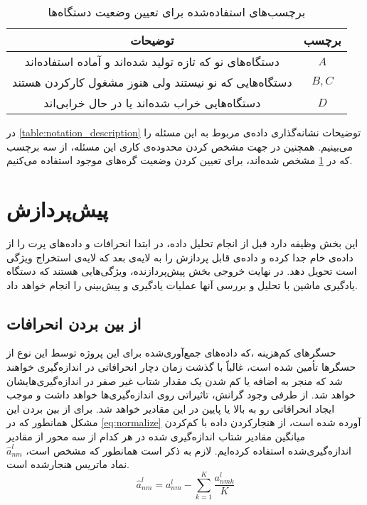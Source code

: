 \begin{table}[h!]
  \begin{center}
    \caption{برچسب‌های استفاده‌شده برای تعیین وضعیت دستگاه‌ها}
    \label{table:node_state_labels}
    \begin{tabular}{|c|c|} %
    	\hline
توضیحات & برچسب\\
    	\hline \hline
دستگاه‌های نو که تازه تولید شده‌اند و آماده استفاده‌اند & $A$\\
    	\hline
دستگاه‌هایی که نو نیستند ولی هنوز مشغول کارکردن هستند & $B, C$\\
    	\hline
  دستگاه‌هایی خراب‌ شده‌اند یا در حال خرابی‌اند & $D$\\
    	\hline
    \end{tabular}
  \end{center}
\end{table}

در \cref{table:notation_description} توضیحات نشانه‌گذاری داده‌ی مربوط به این مسئله را می‌بینیم. همچنین در جهت مشخص کردن محدوده‌ی کاری این مسئله، از سه برچسب که در \cref{table:node_state_labels} مشخص شده‌اند، برای تعیین کردن وضعیت گره‌های موجود استفاده می‌کنیم.

\section{پیش‌پردازش}
این بخش وظیفه دارد قبل از انجام تحلیل داده، در ابتدا انحرافات و داده‌های پرت را از داده‌ی خام جدا کرده و داده‌ی قابل پردازش را به لایه‌ی بعد که لایه‌ی استخراج ویژگی‌ است تحویل دهد. در نهایت خروجی بخش پیش‌پردازنده، ویژگی‌هایی هستند که دستگاه یادگیری ماشین با تحلیل و بررسی آنها عملیات یادگیری و پیش‌بینی را انجام خواهد داد.

\subsection{از بین بردن انحرافات}
 حسگرهای کم‌هزینه  ،که داده‌های جمع‌آوری‌شده برای این پروژه توسط این نوع از حسگرها تأمین شده است، غالباً با گذشت زمان دچار انحرافاتی در اندازه‌گیری خواهند شد که منجر به اضافه یا کم شدن یک مقدار شتاب غیر صفر در اندازه‌گیری‌هایشان خواهد شد. از طرفی وجود گرانش، تاثیراتی روی اندازه‌گیری‌ها خواهد داشت و موجب ایجاد انحرافاتی رو به بالا یا پایین در این مقادیر خواهد شد\cite{jung2017vibration}. برای از بین بردن این مشکل همانطور که در \cref{eq:normalize} آورده شده است\cite{garcia2015data}، از هنجار‌کردن داده با کم‌کردن میانگین مقادیر شتاب اندازه‌گیری شده در هر کدام از سه محور از مقادیر اندازه‌گیری‌شده استفاده کرده‌ایم. لازم به ذکر است همانطور که مشخص است، $\hat{a}^l_{nm}$ نماد ماتریس هنجار‌شده است.
\begin{equation}
\label{eq:normalize}
	\hat{a}^l_{nm}=a^l_{nm}-\sum_{k=1}^K \dfrac{a^l_{nmk}}{K}
\end{equation}



